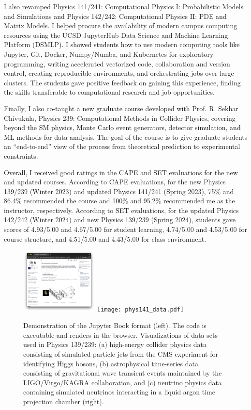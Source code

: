 \documentclass[11pt,letterpaper,notitlepage]{article}
\begin{document}
I also revamped Physics 141/241: Computational Physics I: Probabilistic Models and Simulations and Physics 142/242: Computational Physics II: PDE and Matrix Models.
I helped procure the availability of modern campus computing resources using the UCSD JupyterHub Data Science and Machine Learning Platform (DSMLP).
I showed students how to use modern computing tools like Jupyter, Git, Docker, Numpy/Numba, and Kubernetes for exploratory programming, writing accelerated vectorized code, collaboration and version control, creating reproducible environments, and orchestrating jobs over large clusters.
The students gave positive feedback on gaining this experience, finding the skills transferable to computational research and job opportunities.

Finally, I also co-taught a new graduate course developed with Prof. R. Sekhar Chivukula, Physics 239: Computational Methods in Collider Physics, covering beyond the SM physics, Monte Carlo event generators, detector simulation, and ML methods for data analysis.
The goal of the course is to give graduate students an ``end-to-end'' view of the process from theoretical prediction to experimental constraints.


Overall, I received good ratings in the CAPE and SET evaluations for the new and updated courses.
According to CAPE evaluations, for the new Physics 139/239 (Winter 2023) and updated Physics 141/241 (Spring 2023), 75\% and 86.4\% recommended the course and 100\% and 95.2\% recommended me as the instructor, respectively.
According to SET evaluations, for the updated Physics 142/242 (Winter 2024) and new Physics 139/239 (Spring 2024), students gave scores of 4.93/5.00 and 4.67/5.00 for student learning, 4.74/5.00 and 4.53/5.00 for course structure, and 4.51/5.00 and 4.43/5.00 for class environment.


\begin{figure}[htb]
    \centering
    \includegraphics[width=0.35\textwidth]{jupyterbook.png}
    \texttt{[image: phys141\_data.pdf]}
    \caption{Demonstration of the Jupyter Book format (left).
        The code is executable and renders in the browser.
        Visualizations of data sets used in Physics 139/239: (a) high-energy collider physics data consisting of simulated particle jets from the CMS experiment for identifying Higgs bosons, (b) astrophysical time-series data consisting of gravitational wave transient events maintained by the LIGO/Virgo/KAGRA collaboration, and (c) neutrino physics data containing simulated neutrinos interacting in a liquid argon time projection chamber (right).
        \label{fig:teaching}}
\end{figure}
\end{document}
